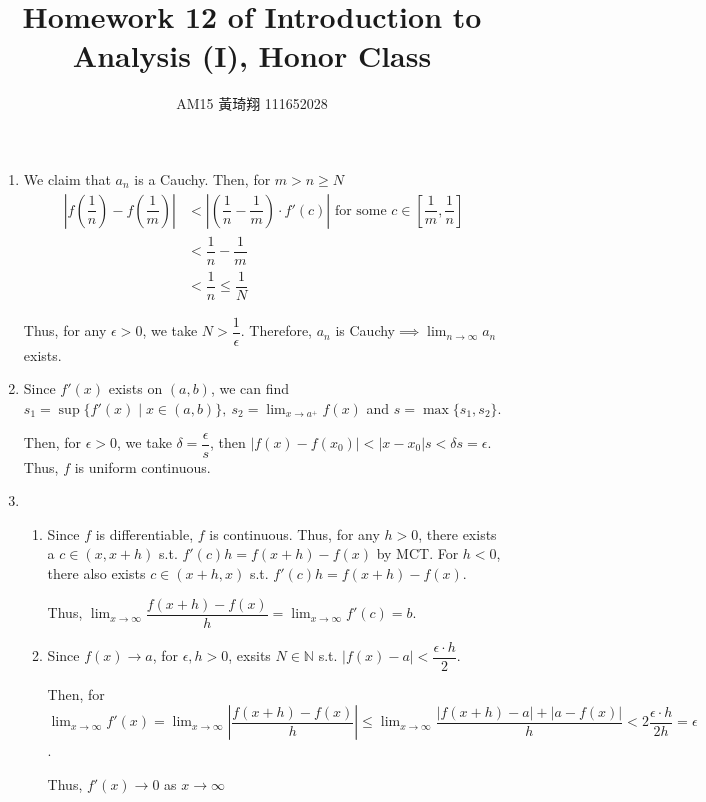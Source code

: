 \documentclass[12pt]{article}
\title{Homework 12 of Introduction to Analysis (I), Honor Class}
\author{AM15 黃琦翔 111652028}
\begin{document}
\maketitle
\begin{enumerate}
    \item We claim that $a_n$ is a Cauchy. 
    Then, for $m > n\geq N$
    \begin{align*}
        |f(\dfrac{1}{n}) - f(\dfrac{1}{m})| &< |(\dfrac{1}{n} - \dfrac{1}{m})\cdot f'(c)| \text{ for some } c\in [\dfrac{1}{m}, \dfrac{1}{n}]\\
        &< \dfrac{1}{n} - \dfrac{1}{m}\\
        &< \dfrac{1}{n} \leq \dfrac{1}{N}
    \end{align*}

    Thus, for any $\epsilon > 0$, we take $N > \dfrac{1}{\epsilon}$.
    Therefore, $a_n$ is Cauchy$\implies \displaystyle\lim_{n\to\infty} a_n$ exists.

    \item Since $f'(x)$ exists on $(a, b)$, we can find $s_1 = \sup\{f'(x) \mid x\in (a, b)\},\ s_2 = \displaystyle\lim_{x\to a^+} f(x)$ and $s = \max\{ s_1, s_2\}$.
    
    Then, for $\epsilon > 0$, we take $\delta = \dfrac{\epsilon}{s}$, then $|f(x) - f(x_0)| < |x - x_0| s < \delta s= \epsilon$.
    Thus, $f$ is uniform continuous.

    \item \begin{enumerate}
        \item Since $f$ is differentiable, $f$ is continuous.
        Thus, for any $h> 0$, there exists a $c \in (x, x+h)$ s.t. $f'(c)h = f(x + h) - f(x)$ by MCT.
        For $h < 0$, there also exists $c\in (x+h, x)$ s.t. $f'(c) h = f(x+h) - f(x)$.

        Thus, $\displaystyle\lim_{x\to\infty} \dfrac{f(x+h) - f(x)}{h} = \displaystyle\lim_{x\to\infty} f'(c) = b$.

        \item Since $f(x) \to a$, for $\epsilon, h> 0$, exsits $N\in\mathbb{N}$ s.t. $|f(x) - a| < \dfrac{\epsilon \cdot h}{2}$.
        
        Then, for $\displaystyle\lim_{x\to\infty} f'(x) = \displaystyle\lim_{x\to\infty} |\dfrac{f(x + h)-f(x)}{h}| \leq \displaystyle\lim_{x\to\infty} \dfrac{|f(x + h) - a| + |a - f(x)|}{h} < 2\dfrac{\epsilon\cdot h}{2h} = \epsilon$.

        Thus, $f'(x) \to 0$ as $x\to \infty$


\end{enumerate}
\end{enumerate}
\end{document}
